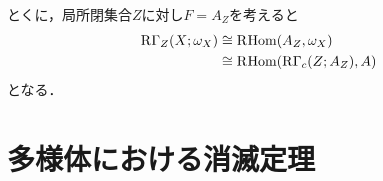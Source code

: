 とくに，局所閉集合\(Z\)に対し\(F=A_Z\)を考えると
\begin{align*}
    \mathop{\mathrm{R}\hspace{-0pt}\Gamma}\nolimits_Z(X;\omega_X)
    &\cong\mathop{\mathrm{R}\hspace{-1.5pt}\mathop{\mathrm{Hom}}\nolimits}\nolimits(A_Z,\omega_X)\\
    &\cong\mathop{\mathrm{R}\hspace{-1.5pt}\mathop{\mathrm{Hom}}\nolimits}\nolimits(\mathop{\mathrm{R}\hspace{-0pt}\Gamma}\nolimits_c(Z;A_Z),A)
\end{align*}
となる．
\begin{comment}
\begin{CMT}
    \begin{align*}
        \RG_Z(X;\omega_X)
        &\cong \RG(X;\RG_Z(\omega_X))\\
        &\cong\RG(X;\RHOM(A_Z,\omega_X))\\
        &\cong\RG(X;{\Rder\mathrm{a}_X}_\ast\RHOM(A_Z,A))\\
        &\cong\RHom(\RG_c(Z;A_Z),A)
    \end{align*}
\end{CMT}
\end{comment}

\section{多様体における消滅定理{\cite[3.2]{KS90}}}

